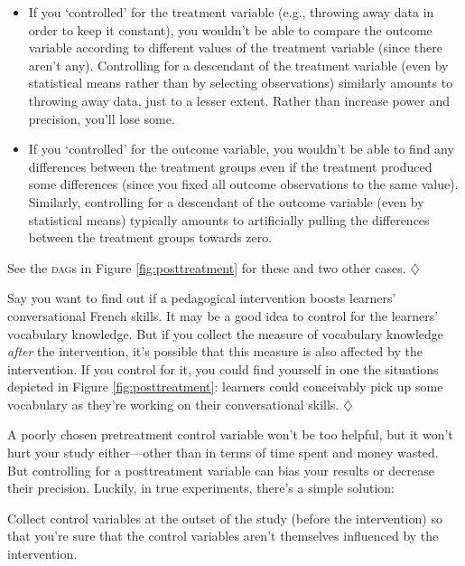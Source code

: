 \documentclass[a4paper]{tufte-book}\usepackage[]{graphicx}\usepackage[]{xcolor}
\newcommand*{\parend}[1][$\diamondsuit$]{%
  \unskip\nobreak\hspace{1em plus 1fill}$\diamondsuit$%
}
\begin{document}
\begin{itemize}
  \item If you `controlled' for the treatment variable
  (e.g., throwing away data in order to keep it constant), you wouldn't be able to compare the outcome variable
  according to different values of the treatment variable (since there aren't any).
  Controlling for a descendant of the treatment variable (even by statistical means
  rather than by selecting observations) similarly amounts to throwing away
  data, just to a lesser extent. Rather than increase power and precision,
  you'll lose some.

  \item If you `controlled' for the outcome variable,
  you wouldn't be able to find any differences between the treatment groups
  even if the treatment produced some differences
  (since you fixed all outcome observations to the same value).
  Similarly, controlling for a descendant of the outcome variable
  (even by statistical means) typically amounts to artificially pulling the
  differences between the treatment groups towards zero.
\end{itemize}

See the \textsc{dag}s in Figure \ref{fig:posttreatment} for these and two other
cases.
\parend

Say you want to find out if a pedagogical intervention boosts
learners' conversational French skills. It may be a good idea to control
for the learners' vocabulary knowledge. But if you collect the measure of
vocabulary knowledge \emph{after} the intervention, it's possible that
this measure is also affected by the intervention. If you control for it,
you could find yourself in one the situations depicted in Figure \ref{fig:posttreatment}:
learners could conceivably pick up some vocabulary as they're working
on their conversational skills.
\parend

\medskip

A poorly chosen pretreatment control variable won't be too helpful, 
but it won't hurt your study either---other than in terms of time spent and
money wasted.
But controlling for a posttreatment variable can bias your results or decrease their precision.
Luckily, in true experiments, there's a simple solution:

\begin{framed}
 Collect control variables at the outset of the study (before the intervention)
 so that you're sure that the control variables aren't themselves influenced by the intervention.
\end{framed}
\end{document}
